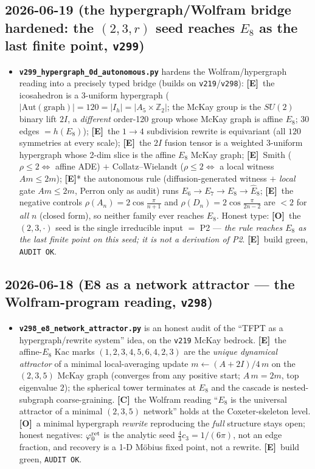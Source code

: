 \documentclass[11pt]{article}
\providecommand{\mE}{\textbf{[E]}}\providecommand{\mC}{\textbf{[C]}}
\providecommand{\mO}{\textbf{[O]}}\providecommand{\mX}{\textbf{[X]}}
\providecommand{\vref}[1]{\texttt{#1}}
\begin{document}
\subsection*{2026-06-19 (the hypergraph/Wolfram bridge hardened: the $(2,3,r)$ seed reaches $E_8$ as the last finite point, \texttt{v299})}
\begin{itemize}
\item \textbf{\texttt{v299\_hypergraph\_0d\_autonomous.py}} hardens the Wolfram/hypergraph reading into a precisely
  typed bridge (builds on \vref{v219}/\vref{v298}): \mE\ the icosahedron is a 3-uniform hypergraph
  ($|\mathrm{Aut(graph)}|=120=|I_h|=|A_5{\times}\mathbb{Z}_2|$; the McKay group is the $SU(2)$ binary lift $2I$, a
  \emph{different} order-120 group whose McKay graph is affine $E_8$; $30$ edges $=h(E_8)$); \mE\ the $1\to4$
  subdivision rewrite is equivariant (all $120$ symmetries at every scale); \mE\ the $2I$ fusion tensor is a
  weighted 3-uniform hypergraph whose 2-dim slice is the affine $E_8$ McKay graph; \mE\ Smith
  ($\rho\le2\Leftrightarrow$ affine ADE) $+$ Collatz--Wielandt ($\rho\le2\Leftrightarrow$ a local witness
  $Am\le2m$); \mE* the autonomous rule (diffusion-generated witness $+$ \emph{local} gate $Am\le2m$, Perron only
  as audit) runs $E_6\to E_7\to E_8\to\hat E_8$; \mE\ the negative controls $\rho(A_n)=2\cos\frac{\pi}{n+1}$ and
  $\rho(D_n)=2\cos\frac{\pi}{2n-2}$ are $<2$ for \emph{all} $n$ (closed form), so neither family ever reaches
  $E_8$. Honest type: \mO\ the $(2,3,\cdot)$ seed is the single irreducible input $=$ P2 --- \emph{the rule
  reaches $E_8$ as the last finite point on this seed; it is not a derivation of P2}. \mE\ build green,
  \texttt{AUDIT OK}.
\end{itemize}

\subsection*{2026-06-18 (E8 as a network attractor --- the Wolfram-program reading, \texttt{v298})}
\begin{itemize}
\item \textbf{\texttt{v298\_e8\_network\_attractor.py}} is an honest audit of the ``TFPT as a hypergraph/rewrite
  system'' idea, on the \vref{v219} McKay bedrock. \mE\ the affine-$E_8$ Kac marks $(1,2,3,4,5,6,4,2,3)$ are the
  \emph{unique dynamical attractor} of a minimal local-averaging update $m\!\leftarrow\!(A{+}2I)/4\,m$ on the
  $(2,3,5)$ McKay graph (converges from any positive start; $A\,m=2m$, top eigenvalue $2$); the spherical tower
  terminates at $E_8$ and the cascade is nested-subgraph coarse-graining. \mC\ the Wolfram reading ``$E_8$ is the
  universal attractor of a minimal $(2,3,5)$ network'' holds at the Coxeter-skeleton level. \mO\ a minimal
  hypergraph \emph{rewrite} reproducing the \emph{full} structure stays open; honest negatives: $\varphi_0^{\mathrm{ret}}$ is the
  analytic seed $\tfrac{4}{3}c_3=1/(6\pi)$, not an edge fraction, and recovery is a 1-D M\"obius fixed point, not
  a rewrite. \mE\ build green, \texttt{AUDIT OK}.
\end{itemize}
\end{document}
